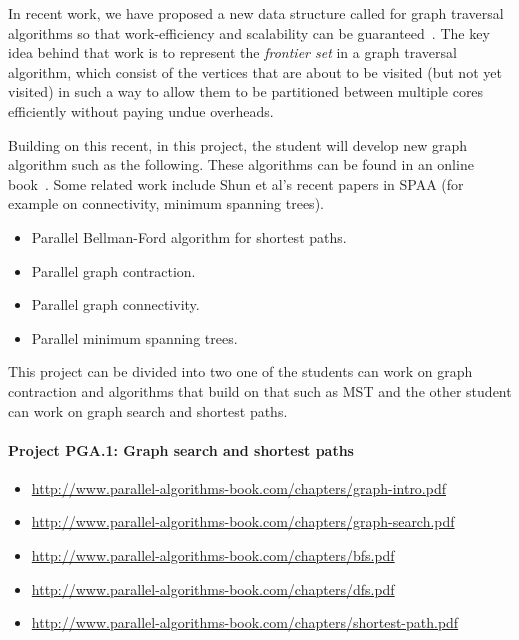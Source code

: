 \documentclass[11pt]{article}
\begin{document}
In recent work, we have proposed a new data structure called for graph
traversal algorithms so that work-efficiency and scalability can be
guaranteed~\cite{AcarChRa14gs}.  The key idea behind that work is
to represent the {\em frontier set} in a graph traversal algorithm,
which consist of the vertices that are about to be visited (but not
yet visited) in such a way to allow them to be partitioned between
multiple cores efficiently without paying undue overheads.

Building on this recent, in this project, the student will develop new
graph algorithm such as the following.  These algorithms can be found
in an online book~\cite{AB-book}.  Some related work include Shun et
al's recent papers in SPAA (for example on connectivity, minimum
spanning trees).

\begin{itemize}
\item
Parallel Bellman-Ford algorithm for shortest paths.

\item
Parallel graph contraction.

\item
Parallel graph connectivity.

\item
Parallel minimum spanning trees.
\end{itemize}




This project can be divided into two one of the students can work on
graph contraction and algorithms that build on that such as MST and 
the other student can work on graph search and shortest paths.



\paragraph{Project PGA.1: Graph search and shortest paths}
\begin{itemize}
\item 
\url{http://www.parallel-algorithms-book.com/chapters/graph-intro.pdf}

\item 
\url{http://www.parallel-algorithms-book.com/chapters/graph-search.pdf}

\item 
\url{http://www.parallel-algorithms-book.com/chapters/bfs.pdf}

\item 
\url{http://www.parallel-algorithms-book.com/chapters/dfs.pdf}
\item 
\url{http://www.parallel-algorithms-book.com/chapters/shortest-path.pdf}
\end{itemize}
\end{document}
